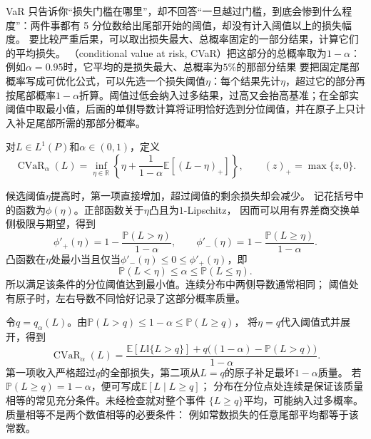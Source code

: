 VaR 只告诉你“损失门槛在哪里”，却不回答“一旦越过门槛，到底会惨到什么程度”：两件事都有 5%
分位数给出尾部开始的阈值，却没有计入阈值以上的损失幅度。
要比较严重后果，可以取出损失最大、总概率固定的一部分结果，计算它们的平均损失。
（conditional value at risk, CVaR）把这部分的总概率取为$1-\alpha$：
例如$\alpha=0.95$时，它平均的是损失最大、总概率为$5\%$的那部分结果
要把固定尾部概率写成可优化公式，可以先选一个损失阈值\(\eta\)：每个结果先计\(\eta\)，超过它的部分再按尾部概率\(1-\alpha\)折算。阈值过低会纳入过多结果，过高又会抬高基准；在全部实阈值中取最小值，后面的单侧导数计算将证明恰好选到分位阈值，并在原子上只计入补足尾部所需的那部分概率。
\begin{definition}[条件风险价值]
\label{def:decision-conditional-value-at-risk}
对$L\in L^1(P)$和$\alpha\in(0,1)$，定义
\begin{equation}
  \operatorname{CVaR}_\alpha(L)
  =\inf_{\eta\in\mathbb R}
    \left\{\eta+\frac{1}{1-\alpha}\mathbb E[(L-\eta)_+]\right\},
  \qquad (z)_+=\max\{z,0\}.
  \label{eq:decision-cvar-optimization}
\end{equation}
\end{definition}
候选阈值$\eta$提高时，第一项直接增加，超过阈值的剩余损失却会减少。
记花括号中的函数为$\phi(\eta)$。正部函数关于$\eta$凸且为$1$-Lipschitz，
因而可以用有界差商交换单侧极限与期望，得到
\[
  \phi'_+(\eta)=1-\frac{\mathbb P(L>\eta)}{1-\alpha},\qquad
  \phi'_-(\eta)=1-\frac{\mathbb P(L\geq\eta)}{1-\alpha}.
\]
凸函数在$\eta$处最小当且仅当$\phi'_-(\eta)\leq0\leq\phi'_+(\eta)$，即
\begin{equation}
  \mathbb P(L<\eta)\leq\alpha\leq\mathbb P(L\leq\eta).
  \label{eq:decision-cvar-quantile-condition}
\end{equation}
所以满足该条件的分位阈值达到最小值。连续分布中两侧导数通常相同；
阈值处有原子时，左右导数不同恰好记录了这部分概率质量。

令$q=q_\alpha(L)$。由$\mathbb P(L>q)\leq1-\alpha\leq\mathbb P(L\geq q)$，
将$\eta=q$代入阈值式并展开，得到
\begin{equation}
  \operatorname{CVaR}_\alpha(L)=
  \frac{\mathbb E[L\mathbb I\{L>q\}]
    +q\bigl((1-\alpha)-\mathbb P(L>q)\bigr)}{1-\alpha}.
  \label{eq:decision-cvar-atomic-tail}
\end{equation}
第一项收入严格超过$q$的全部损失，第二项从$L=q$的原子补足最坏$1-\alpha$质量。
若$\mathbb P(L\geq q)=1-\alpha$，便可写成$\mathbb E[L\mid L\geq q]$；
分布在分位点处连续是保证该质量相等的常见充分条件。未经检查就对整个事件
$\{L\geq q\}$平均，可能纳入过多概率。质量相等不是两个数值相等的必要条件：
例如常数损失的任意尾部平均都等于该常数。

